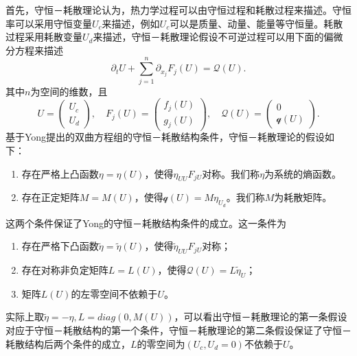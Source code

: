 	首先，守恒－耗散理论认为，热力学过程可以由守恒过程和耗散过程来描述。守恒率可以采用守恒变量$U_c$来描述，例如$U_c$可以是质量、动量、能量等守恒量。耗散过程采用耗散变量$U_d$来描述，守恒－耗散理论假设不可逆过程可以用下面的偏微分方程来描述
	\begin{equation}\label{eq:CDF}
		\partial_t U + \sum_{j=1}^n \partial_{x_j} F_j(U) = \mathcal{Q} (U) .
	\end{equation}
	其中$n$为空间的维数，且
	\begin{equation*}
		U = \left( \begin{array}{c}
			U_c \\ U_d 
			\end{array} \right) , \quad
			F_j(U)= \left( \begin{array}{c}
			f_j(U) \\ g_j(U)
			\end{array} \right), \quad 
			\mathcal{Q}(U) = \left( \begin{array}{c}
			0 \\ \mathcal{q} (U) 
			\end{array} \right).
	\end{equation*}
	基于Yong提出的双曲方程组的守恒－耗散结构条件，守恒－耗散理论的假设如下\cite{zhu2014conservation}：
	\begin{enumerate}
		\item 存在严格上凸函数$\eta = \eta (U)$，使得$\eta_{UU} F_{jU}$对称。我们称$\eta$为系统的熵函数。
		\item 存在正定矩阵$M = M(U)$，使得$\mathcal{q}(U) = M \eta_{U_d}$。我们称$M$为耗散矩阵。
	\end{enumerate}

	这两个条件保证了Yong的守恒－耗散结构条件的成立。这一条件为\cite{yong2008interesting}
	\begin{enumerate}
		\item 存在严格下凸函数$\tilde{\eta} = \tilde{\eta} (U)$，使得$\tilde{\eta}_{UU} F_{jU}$对称；
		\item 存在对称非负定矩阵$L = L(U)$，使得$\mathcal{Q}(U) = L \tilde{\eta}_{U}$；
		\item 矩阵$L(U)$的左零空间不依赖于$U$。
	\end{enumerate}
	实际上取$\tilde{\eta} = - \eta, L = diag( 0, M(U))$，可以看出守恒－耗散理论的第一条假设对应于守恒－耗散结构的第一个条件，守恒－耗散理论的第二条假设保证了守恒－耗散结构后两个条件的成立，$L$的零空间为$(U_c,U_d=0)$不依赖于$U$。

